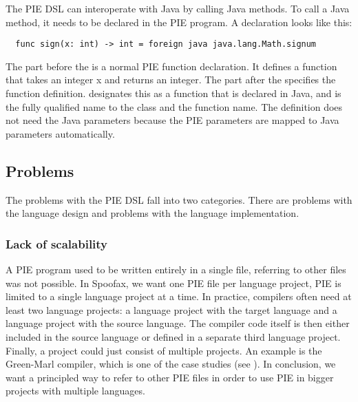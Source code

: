The \ac{PIE} \ac{DSL} can interoperate with Java by calling Java methods.
To call a Java method, it needs to be declared in the \ac{PIE} program.
A declaration looks like this:
\begin{lstlisting}
  func sign(x: int) -> int = foreign java java.lang.Math.signum
\end{lstlisting}
The part before the \inlinecode{=} is a normal \ac{PIE} function declaration.
It defines a function  that takes an integer x and returns an integer.
The part after the \inlinecode{=} specifies the function definition.
 designates this as a function that is declared in Java, and  is the fully qualified name to the class and the function name.
The definition does not need the Java parameters because the \ac{PIE} parameters are mapped to Java parameters automatically.

\subsection{Problems}
\label{subsec:problem_analysis__problems}

The problems with the \ac{PIE} \ac{DSL} fall into two categories.
There are problems with the language design and problems with the language implementation.

\subsubsection{Lack of scalability}
\label{subsubsec:problem_analysis__problems__scalability}

A \ac{PIE} program used to be written entirely in a single file, referring to other files was not possible.
In Spoofax, we want one \ac{PIE} file per language project, \ac{PIE} is limited to a single language project at a time.
In practice, compilers often need at least two language projects: a language project with the target language and a language project with the source language.
The compiler code itself is then either included in the source language or defined in a separate third language project.
Finally, a project could just consist of multiple projects.
An example is the Green-Marl compiler, which is one of the case studies (see ).
In conclusion, we want a principled way to refer to other \ac{PIE} files in order to use \ac{PIE} in bigger projects with multiple languages.

